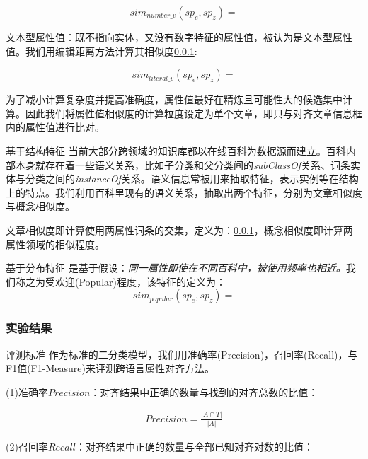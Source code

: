 \begin{equation}
\label{equ:number_value_similarity}
sim_{number\_v}(sp_e, sp_z) =
\end{equation}

文本型属性值：既不指向实体，又没有数字特征的属性值，被认为是文本型属性值。我们用编辑距离方法计算其相似度\ref{}:

\begin{equation}
\label{equ:literal_value_similarity}
sim_{literal\_v}(sp_e, sp_z) =
\end{equation}

为了减小计算复杂度并提高准确度，属性值最好在精炼且可能性大的候选集中计算。因此我们将属性值相似度的计算粒度设定为单个文章，即只与对齐文章信息框内的属性值进行比对。


{\heiti 基于结构特征}
当前大部分跨领域的知识库都以在线百科为数据源而建立。百科内部本身就存在着一些语义关系，比如子分类和父分类间的\textit{subClassOf}关系、词条实体与分类之间的\textit{instanceOf}关系。语义信息常被用来抽取特征\cite{wang2014cross}，表示实例等在结构上的特点。我们利用百科里现有的语义关系，抽取出两个特征，分别为文章相似度与概念相似度。

文章相似度即计算使用两属性词条的交集，定义为：\ref{}，概念相似度即计算两属性领域的相似程度。

{\heiti 基于分布特征}
是基于假设：\textit{同一属性即使在不同百科中，被使用频率也相近。}我们称之为受欢迎(Popular)程度，该特征的定义为：
\begin{equation}
sim_{popular}(sp_e, sp_z) =
\end{equation}

\subsubsection{实验结果}

{\heiti 评测标准}
作为标准的二分类模型，我们用准确率(Precision)，召回率(Recall)，与F1值(F1-Measure)来评测跨语言属性对齐方法。

(1)准确率$Precision$：对齐结果中正确的数量与找到的对齐总数的比值：

\begin{align}
Precision = \frac { \left| A\cap T \right|  }{ \left| A \right|  } 
\end{align}

(2)召回率$Recall$：对齐结果中正确的数量与全部已知对齐对数的比值：

